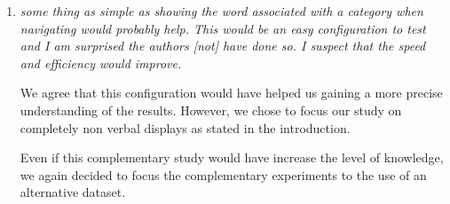 \documentclass[10pt]{article}
\begin{document}
\begin{enumerate}
\item \emph{some thing 
as simple as showing the word associated with a category when navigating would probably help. This would be an easy configuration to test and I am surprised the authors [not]
have done so. I suspect that the speed and efficiency would improve.
}

We agree that this configuration would have helped us gaining a more precise understanding of the results. However, we chose to focus our study on completely non verbal displays as stated in the introduction.

Even if this complementary study would have increase the level of knowledge, we again decided to focus the complementary experiments to the use of an alternative dataset.

\end{enumerate}
\end{document}
